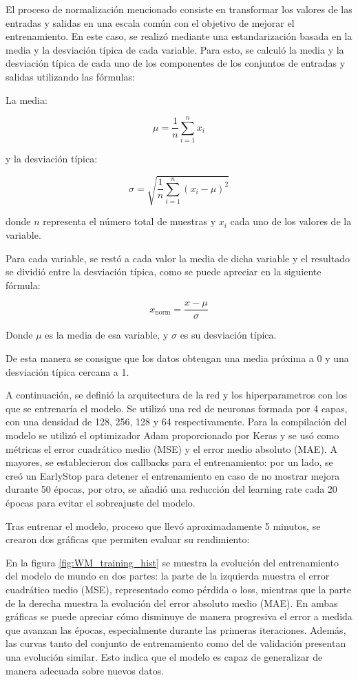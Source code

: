 El proceso de normalización mencionado consiste en transformar los valores de las entradas y salidas en una escala común con el objetivo de mejorar el entrenamiento. En este caso, se realizó 
mediante una estandarización basada en la media y la desviación típica de cada variable. Para esto, se calculó la media y la desviación típica de cada uno de los componentes de los conjuntos 
de entradas y salidas utilizando las fórmulas:

La media:

\[
\mu = \frac{1}{n}\sum_{i=1}^{n} x_i
\]

y la desviación típica:

\[
\sigma = \sqrt{\frac{1}{n}\sum_{i=1}^{n}(x_i - \mu)^2}
\]

donde \(n\) representa el número total de muestras y \(x_i\) cada uno de los valores de la variable.

Para cada variable, se restó a cada valor la media de dicha variable y el resultado se dividió entre la desviación típica, como se puede apreciar en la siguiente fórmula:

\[
x_{\text{norm}} = \frac{x - \mu}{\sigma}
\]

Donde \(\mu\) es la media de esa variable, y \(\sigma\) es su desviación típica.

De esta manera se consigue que los datos obtengan una media próxima a 0 y una desviación típica cercana a 1.

A continuación, se definió la arquitectura de la red y los hiperparametros con los que se entrenaría el modelo. Se utilizó una red de neuronas formada por 4 capas, con una densidad de 128, 
256, 128 y 64 respectivamente. Para la compilación del modelo se utilizó el optimizador Adam proporcionado por Keras y se usó como métricas el error cuadrático medio (MSE) y el error medio 
absoluto (MAE). A mayores, se establecieron dos callbacks para el entrenamiento: por un lado, se creó un EarlyStop para detener el entrenamiento en caso de no mostrar mejora durante 50 épocas, 
por otro, se añadió una reducción del learning rate cada 20 épocas para evitar el sobreajuste del modelo.

Tras entrenar el modelo, proceso que llevó aproximadamente 5 minutos, se crearon dos gráficas que permiten evaluar su rendimiento:

En la figura \ref{fig:WM_training_hist} se muestra la evolución del entrenamiento del modelo de mundo en dos partes: la parte de la izquierda muestra el error cuadrático medio (MSE), representado 
como pérdida o loss, mientras que la parte de la derecha muestra la evolución del error absoluto medio (MAE). En ambas gráficas se puede apreciar cómo disminuye de manera progresiva el 
error a medida que avanzan las épocas, especialmente durante las primeras iteraciones. Además, las curvas tanto del conjunto de entrenamiento como del de validación presentan una evolución 
similar. Esto indica que el modelo es capaz de generalizar de manera adecuada sobre nuevos datos.


